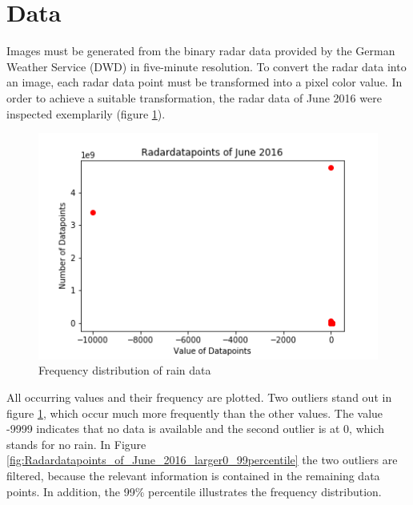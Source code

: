\documentclass[oneside]{htwg-report}
\begin{document}
\section*{Data}\label{data}
\begin{sloppypar}
Images must be generated from the binary radar data provided by the German Weather Service (DWD) in five-minute resolution.
To convert the radar data into an image, each radar data point must be transformed into a pixel color value.
In order to achieve a suitable transformation, the radar data of June 2016 were inspected exemplarily (figure \ref{fig:Radardatapoints_of_June_2016}). 
\end{sloppypar}
\begin{figure}[ht]
    \centering
    \includegraphics[width=0.8\linewidth,angle=0]{../abb/Radardatapoints_of_June_2016.png}
    \caption[Datenaufbereitung]{Frequency distribution of rain data}
    \label{fig:Radardatapoints_of_June_2016}
\end{figure}
\begin{sloppypar}
All occurring values and their frequency are plotted. 
Two outliers stand out in figure \ref{fig:Radardatapoints_of_June_2016}, which occur much more frequently than the other values. 
The value -9999 indicates that no data is available and the second outlier is at 0, which stands for no rain. 
In Figure \ref{fig:Radardatapoints_of_June_2016_larger0_99percentile} the two outliers are filtered, because the relevant information is contained in the remaining data points.
In addition, the 99\% percentile illustrates the frequency distribution. 
\end{sloppypar}
\end{document}

